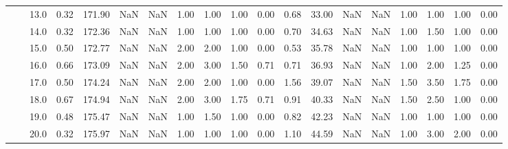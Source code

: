 \begin{tabular}{lllrrrrrrrrrrrrrrrr}
       &     & 13.0 &      0.32 &     171.90 &               NaN &                NaN &  1.00 &   1.00 &             1.00 &                         0.00 &      0.68 &      33.00 &               NaN &                NaN &  1.00 &   1.00 &             1.00 &                         0.00 \\
       &     & 14.0 &      0.32 &     172.36 &               NaN &                NaN &  1.00 &   1.00 &             1.00 &                         0.00 &      0.70 &      34.63 &               NaN &                NaN &  1.00 &   1.50 &             1.00 &                         0.00 \\
       &     & 15.0 &      0.50 &     172.77 &               NaN &                NaN &  2.00 &   2.00 &             1.00 &                         0.00 &      0.53 &      35.78 &               NaN &                NaN &  1.00 &   1.00 &             1.00 &                         0.00 \\
       &     & 16.0 &      0.66 &     173.09 &               NaN &                NaN &  2.00 &   3.00 &             1.50 &                         0.71 &      0.71 &      36.93 &               NaN &                NaN &  1.00 &   2.00 &             1.25 &                         0.00 \\
       &     & 17.0 &      0.50 &     174.24 &               NaN &                NaN &  2.00 &   2.00 &             1.00 &                         0.00 &      1.56 &      39.07 &               NaN &                NaN &  1.50 &   3.50 &             1.75 &                         0.00 \\
       &     & 18.0 &      0.67 &     174.94 &               NaN &                NaN &  2.00 &   3.00 &             1.75 &                         0.71 &      0.91 &      40.33 &               NaN &                NaN &  1.50 &   2.50 &             1.00 &                         0.00 \\
       &     & 19.0 &      0.48 &     175.47 &               NaN &                NaN &  1.00 &   1.50 &             1.00 &                         0.00 &      0.82 &      42.23 &               NaN &                NaN &  1.00 &   1.00 &             1.00 &                         0.00 \\
       &     & 20.0 &      0.32 &     175.97 &               NaN &                NaN &  1.00 &   1.00 &             1.00 &                         0.00 &      1.10 &      44.59 &               NaN &                NaN &  1.00 &   3.00 &             2.00 &                         0.00 \\

\end{tabular}
